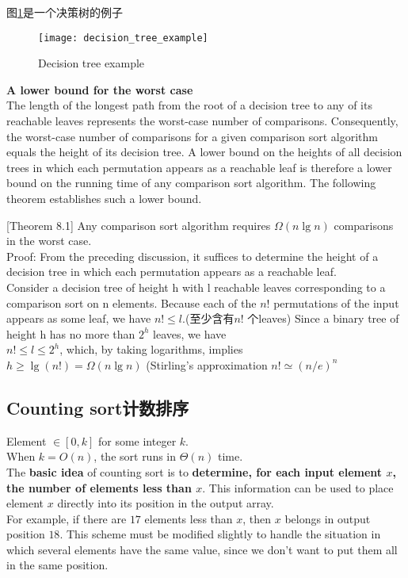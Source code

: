 \documentclass{article}
\begin{document}
图\ref{fig.decision_tree.example}是一个决策树的例子
\begin{figure}[htbp]
  \centering
  \texttt{[image: decision\_tree\_example]}\\
  \caption{Decision tree example}\label{fig.decision_tree.example}
\end{figure}

\textbf{A lower bound for the worst case}\\
The length of the longest path from the root of a decision tree to any of its reachable leaves represents the worst-case number of comparisons. Consequently,
the worst-case number of comparisons for a given comparison sort algorithm equals the height of its decision tree. A lower bound on the heights of all decision trees in which each permutation appears as a reachable leaf is therefore a lower bound on the running time of any comparison sort algorithm. The following theorem establishes such a lower bound.

[Theorem 8.1] Any comparison sort algorithm requires $\Omega(n \lg n)$ comparisons in the worst case.\\
Proof: From the preceding discussion, it suffices to determine the height of a decision tree in which each permutation appears as a reachable leaf.\\
Consider a decision tree of height h with l reachable leaves corresponding to a comparison sort on n elements.
Because each of the $n!$ permutations of the input appears as some leaf, we have $n! \leq l$.(至少含有$n!$ 个leaves)
Since a binary tree of height h has no more than $2^h$ leaves, we have\\
$n! \leq l \leq 2^h$,
which, by taking logarithms, implies\\
$h \geq \lg (n!) = \Omega(n\lg n)$ (Stirling's approximation $n! \simeq (n/e)^n$

\subsection{Counting sort计数排序}
Element $\in [0, k]$ for some integer $k$. \\
When $k = O(n)$, the sort runs in $\Theta(n)$ time.\\
The \textbf{basic idea} of counting sort is to \textbf{determine, for each input element $x$, the number of elements less than $x$}.
This information can be used to place element $x$ directly into its position in the output array.\\
For example, if there are $17$ elements less than $x$, then $x$ belongs in output position $18$.
This scheme must be modified slightly to handle the situation in which several elements have the same value,
since we don't want to put them all in the same position.
\end{document}
